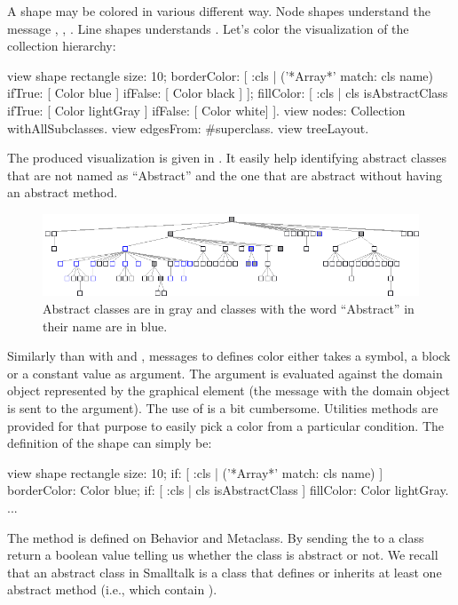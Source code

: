 \documentclass[a4paper,10pt,twoside]{book}
\begin{document}
A shape may be colored in various different way. Node shapes understand the message , , . Line shapes understands . Let's color the visualization of the collection hierarchy:

\begin{code}{}
view shape rectangle
	size: 10;
	borderColor: [ :cls | ('*Array*' match: cls name) 
										ifTrue: [ Color blue ] 
										ifFalse: [ Color black ] ];
	fillColor: [ :cls | cls isAbstractClass ifTrue: [ Color lightGray ] ifFalse: [ Color white] ].
view nodes: Collection withAllSubclasses.
view edgesFrom: #superclass.
view treeLayout.
\end{code}

The produced visualization is given in . It easily help identifying abstract classes that are not named as ``Abstract'' and the one that are abstract without having an abstract method.

\begin{figure}[htbp]
\centerline{\includegraphics[width=\linewidth]{abstractClasses}}
\caption{Abstract classes are in gray and classes with the word ``Abstract'' in their name are in blue.}
\label{fig:abstractClasses}
\end{figure}

Similarly than with  and , messages to defines color either takes a symbol, a block or a constant value as argument. The argument is evaluated against the domain object represented by the graphical element (the message  with the domain object is sent to the argument). 
The use of  is a bit cumbersome. Utilities methods are provided for that purpose to easily pick a color from a particular condition. The definition of the shape can simply be:

\begin{code}{}
view shape rectangle
	size: 10;
	if: [ :cls | ('*Array*' match: cls name) ] borderColor: Color blue;
	if: [ :cls | cls isAbstractClass ] fillColor: Color lightGray.
...
\end{code}

The method  is defined on Behavior and Metaclass. By sending the  to a class return a boolean value telling us whether the class is abstract or not. We recall that an abstract class in Smalltalk is a class that defines or inherits at least one  abstract method (i.e., which contain ).
\end{document}
